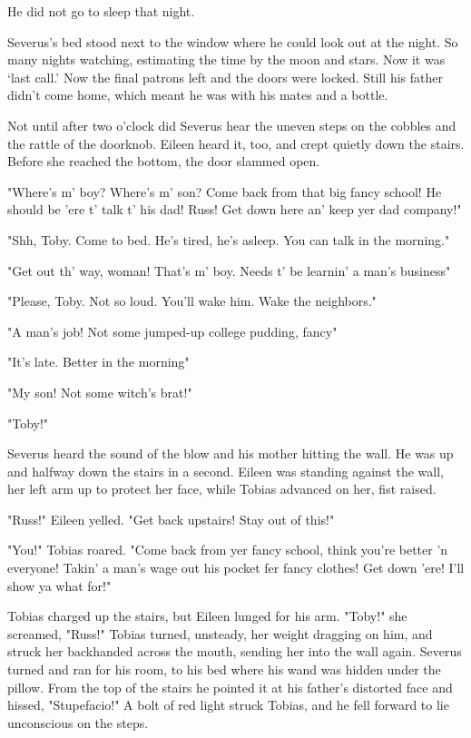 He did not go to sleep that night.

Severus's bed stood next to the window where he could look out at the night. So many nights watching, estimating the time by the moon and stars. Now it was `last call.' Now the final patrons left and the doors were locked. Still his father didn't come home, which meant he was with his mates and a bottle.

Not until after two o'clock did Severus hear the uneven steps on the cobbles and the rattle of the doorknob. Eileen heard it, too, and crept quietly down the stairs. Before she reached the bottom, the door slammed open.

"Where's m' boy? Where's m' son? Come back from that big fancy school! He should be 'ere t' talk t' his dad! Russ! Get down here an' keep yer dad company!"

"Shh, Toby. Come to bed. He's tired, he's asleep. You can talk in the morning."

"Get out th' way, woman! That's m' boy. Needs t' be learnin' a man's business{\el}"

"Please, Toby. Not so loud. You'll wake him. Wake the neighbors."

"A man's job! Not some jumped-up college pudding, fancy{\el}"

"It's late. Better in the morning{\el}"

"My son! Not some witch's brat!"

"Toby!"

Severus heard the sound of the blow and his mother hitting the wall. He was up and halfway down the stairs in a second. Eileen was standing against the wall, her left arm up to protect her face, while Tobias advanced on her, fist raised.

"Russ!" Eileen yelled. "Get back upstairs! Stay out of this!"

"You!" Tobias roared. "Come back from yer fancy school, think you're better 'n everyone! Takin' a man's wage out his pocket fer fancy clothes! Get down 'ere! I'll show ya what for!"

Tobias charged up the stairs, but Eileen lunged for his arm. "Toby!" she screamed, "Russ!" Tobias turned, unsteady, her weight dragging on him, and struck her backhanded across the mouth, sending her into the wall again. Severus turned and ran for his room, to his bed where his wand was hidden under the pillow. From the top of the stairs he pointed it at his father's distorted face and hissed, "Stupefacio!" A bolt of red light struck Tobias, and he fell forward to lie unconscious on the steps.

